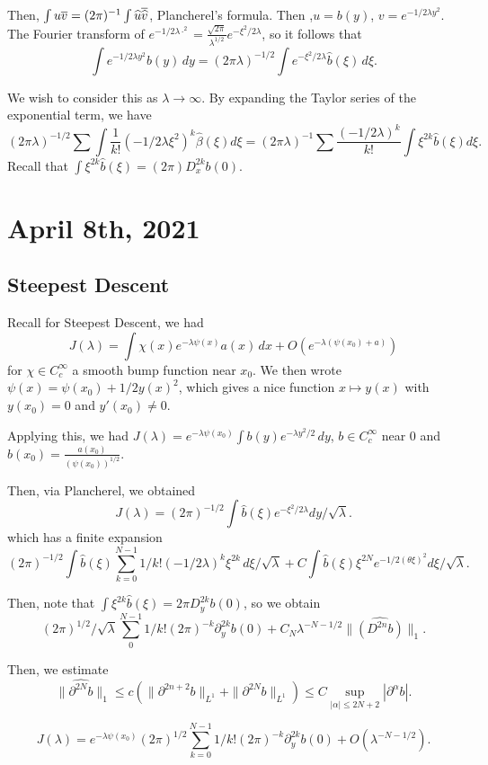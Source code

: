 \documentclass[12pt]{scrartcl}
\renewcommand{\hat}{\widehat}
\newcommand{\<}{\langle}
\renewcommand{\>}{\rangle}
\begin{document}
Then, $\int u\ol v = (2\pi)^{-1} \int \hat{u} \ol{\hat{v}}$, Plancherel's formula.  Then ,$u = b(y)$, $v = e^{-1/2 \lambda y^2}$.  The Fourier transform of $e^{-1/2 \lambda \cdot ^2} = \frac{\sqrt{2\pi}}{ \lambda^{1/2}} e^{-\xi^2/2\lambda}$, so it follows that 
$$\int e^{-1/2 \lambda y^2} b(y)\,dy = (2\pi \lambda)^{-1/2} \int e^{-\xi^2/2\lambda} \hat{b}(\xi)\,d\xi.$$

We wish to consider this as $\lambda \to \infty$.  By expanding the Taylor series of the exponential term, we have
$$(2\pi\lambda)^{-1/2} \sum \int \frac{1}{k!} (-1/2\lambda \xi^2)^k \hat{\beta}(\xi)d\xi = (2\pi\lambda)^{-1} \sum \frac{(-1/2\lambda)^k}{k!} \int \xi^{2k} \hat{b}(\xi) d\xi.$$
Recall that $\int \xi^{2k} \hat{b}(\xi) = (2\pi) D_x^{2k} b(0)$.
\pagebreak
\section{April 8th, 2021}
\subsection{Steepest Descent}
Recall for Steepest Descent, we had 
$$J(\lambda) = \int \chi(x) e^{-\lambda \psi(x)}a(x)\,dx + O(e^{-\lambda(\psi(x_0) + a)})$$
for $\chi \in C_c^\infty$ a smooth bump function near $x_0$.  We then wrote $\psi(x) = \psi(x_0) + 1/2 y(x)^2$, which gives a nice function $x \mapsto y(x)$ with $y(x_0) = 0$ and $y'(x_0) \ne 0$.

Applying this, we had $J(\lambda) = e^{-\lambda \psi(x_0)}\int b(y) e^{-\lambda y^2/2}\,dy$, $b \in C_c^\infty$ near $0$ and $b(x_0) = \frac{a(x_0)}{(\psi(x_0))^{1/2}}$.

Then, via Plancherel, we obtained
$$J(\lambda) = (2\pi)^{-1/2} \int \hat{b}(\xi) e^{-\xi^2/2\lambda} dy/\sqrt{\lambda}.$$
which has a finite expansion
$$(2\pi)^{-1/2} \int \hat{b}(\xi) \sum_{k=0}^{N-1} 1/k! (-1/2\lambda)^k \xi^{2k}\,d\xi/\sqrt{\lambda} + C \int \hat{b}(\xi) \xi^{2N} e^{-1/2(\theta \xi)^2} d\xi/\sqrt{\lambda}.$$

Then, note that 
$\int \xi^{2k} \hat{b}(\xi) = 2\pi D_y^{2k}b(0)$, so we obtain
$$(2\pi)^{1/2}/\sqrt{\lambda} \sum_0^{N-1} 1/k! (2\pi)^{-k} \partial_y^{2k}b(0) + C_N \lambda^{-N - 1/2}\| \hat{(D^{2n}b)} \|_1.$$

Then, we estimate
$$\|\hat{\partial^{2N} b}\|_1 \le c (\| \partial^{2n + 2}b \|_{L^1}  + \| \partial^{2N} b\|_{L^1}) \le C \sup_{|\alpha| \le 2N + 2} |\partial^\alpha b|.$$


$$J(\lambda) = e^{-\lambda \psi(x_0)} (2\pi)^{1/2} \sum_{k=0}^{N-1} 1/k! (2\pi)^{-k} \partial_y^{2k} b(0) + O(\lambda^{-N - 1/2}).$$
\end{document}
